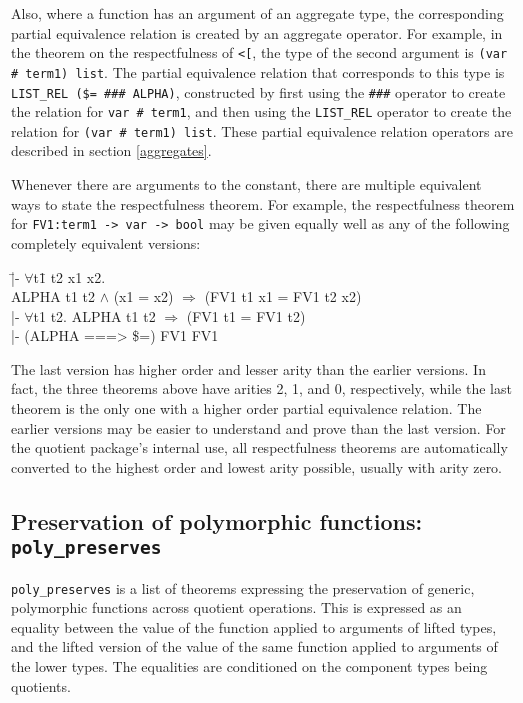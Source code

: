 \documentclass[envcountsame,runningheads]{llncs}
\newcommand{\quotient}{partial equivalence}
\begin{document}
Also, where a function has an argument of an aggregate type,
the corresponding \quotient{} relation is created by an aggregate operator. 
For example, in the theorem on the respectfulness of 
{\tt <[}, the
type of the second argument is
{\tt (var \# term1) list}. 
The
\quotient{}
relation that corresponds to this type is
{\tt LIST\_REL (\$= \#\#\# ALPHA)},
constructed by first
using the {\tt \#\#\#} operator to create the
relation for
{\tt var \# term1},
and then using the {\tt LIST\_REL}
operator to create the
relation for
{\tt (var \# term1) list}.
These \quotient{} relation operators
are described in section \ref{aggregates}.

Whenever there are arguments to the constant, there are
multiple equivalent ways to state the respectfulness theorem.
For example, the respectfulness theorem for {\tt FV1:term1 -> var -> bool} may be given
equally well as any of the following completely equivalent versions:
{\tt \begin{tabbing}
\hspace{5.5mm}
    \=|- $\forall$t\=1 t2 x1 x2. \\
\>\>     ALPHA t1 t2 $\wedge$ (x1 = x2) $\Rightarrow$ (FV1 t1 x1 = FV1 t2 x2) \\
\>  |- $\forall$t1 t2. ALPHA t1 t2 $\Rightarrow$ (FV1 t1 = FV1 t2) \\
\>  |- (ALPHA ===> \$=) FV1 FV1
\end{tabbing}}
The last version has higher order and lesser arity than the
earlier versions.  In fact, the three theorems above have arities
2, 1, and 0, respectively,
while the last theorem is the only one with a
higher order \quotient{} relation.
The earlier versions may be easier to understand and prove than the
last version.  For the quotient package's internal use, all respectfulness
theorems are automatically converted to the highest order and lowest
arity possible, usually with arity zero.


%
\subsection{
Preservation
of polymorphic functions: {\tt poly\_preserves}}
%
\label{polypreserves}

{\tt poly\_preserves} is a list of theorems expressing the preservation
of generic, polymorphic functions across quotient operations.
This is expressed as an
equality between the value of the function applied to arguments of
lifted types, and the lifted version of the value of the same function
applied to arguments of the lower types. 
The equalities are conditioned on the component types being quotients.
\end{document}
